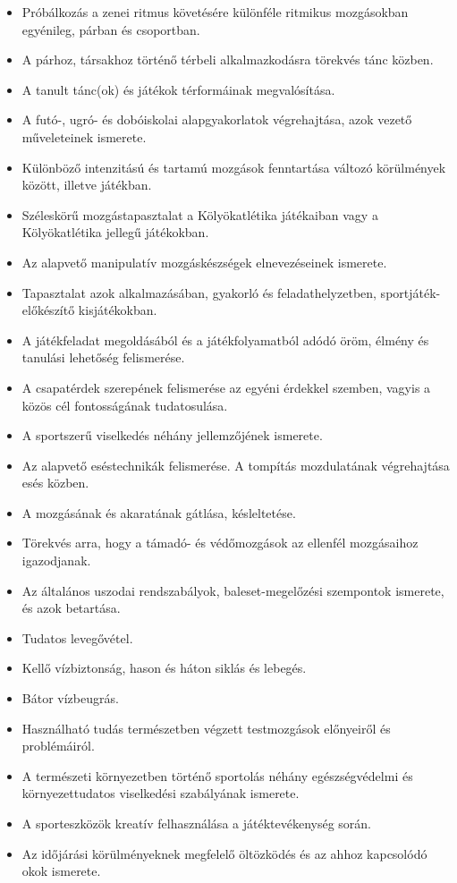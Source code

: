 \begin{itemize}
\item Próbálkozás a zenei ritmus követésére különféle ritmikus mozgásokban egyénileg, párban és csoportban.
\item A párhoz, társakhoz történő térbeli alkalmazkodásra törekvés tánc közben.
\item A tanult tánc(ok) és játékok térformáinak megvalósítása.
\item A futó-, ugró- és dobóiskolai alapgyakorlatok végrehajtása, azok vezető műveleteinek ismerete.
\item Különböző intenzitású és tartamú mozgások fenntartása változó körülmények között, illetve játékban.
\item Széleskörű mozgástapasztalat a Kölyökatlétika játékaiban vagy a Kölyökatlétika jellegű játékokban.
\item Az alapvető manipulatív mozgáskészségek elnevezéseinek ismerete.
\item Tapasztalat azok alkalmazásában, gyakorló és feladathelyzetben, sportjáték-előkészítő kisjátékokban.
\item A játékfeladat megoldásából és a játékfolyamatból adódó öröm, élmény és tanulási lehetőség felismerése.
\item A csapatérdek szerepének felismerése az egyéni érdekkel szemben, vagyis a közös cél fontosságának tudatosulása.
\item A sportszerű viselkedés néhány jellemzőjének ismerete.
\item Az alapvető eséstechnikák felismerése. A tompítás mozdulatának végrehajtása esés közben.
\item A mozgásának és akaratának gátlása, késleltetése.
\item Törekvés arra, hogy a támadó- és védőmozgások az ellenfél mozgásaihoz igazodjanak.
\item Az általános uszodai rendszabályok, baleset-megelőzési szempontok ismerete, és azok betartása.
\item Tudatos levegővétel.
\item Kellő vízbiztonság, hason és háton siklás és lebegés.
\item Bátor vízbeugrás.
\item Használható tudás természetben végzett testmozgások előnyeiről és problémáiról.
\item A természeti környezetben történő sportolás néhány egészségvédelmi és környezettudatos viselkedési szabályának ismerete.
\item A sporteszközök kreatív felhasználása a játéktevékenység során.
\item Az időjárási körülményeknek megfelelő öltözködés és az ahhoz kapcsolódó okok ismerete.
\end{itemize}
